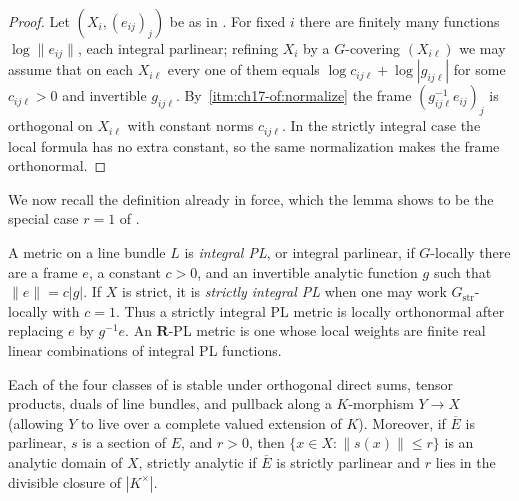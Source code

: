 \begin{proof}
Let $(X_i,(e_{ij})_j)$ be as in .  For
fixed $i$ there are finitely many functions $\log\|e_{ij}\|$, each
integral parlinear; refining $X_i$ by a $G$-covering $(X_{i\ell})$ we
may assume that on each $X_{i\ell}$ every one of them equals
$\log c_{ij\ell}+\log|g_{ij\ell}|$ for some $c_{ij\ell}>0$ and invertible
$g_{ij\ell}$.  By
\,\cref{itm:ch17-of:normalize} the frame
$(g_{ij\ell}^{-1}e_{ij})_j$ is orthogonal on $X_{i\ell}$ with constant
norms $c_{ij\ell}$.  In the strictly integral case the local formula has
no extra constant, so the same normalization makes the frame orthonormal.
\end{proof}

We now recall the definition already in force, which the lemma shows to be
the special case $r=1$ of .

\begin{definition}
\label{def:ch17-integral-pl-metric}
A metric on a line bundle $L$ is \emph{integral PL}, or integral
parlinear, if $G$-locally there are a frame $e$, a constant $c>0$, and an
invertible analytic function $g$ such that $\|e\|=c|g|$.  If $X$ is
strict, it is \emph{strictly integral PL} when one may work
$G_{\mathrm{str}}$-locally with $c=1$.  Thus a strictly integral PL metric
is locally orthonormal after replacing $e$ by $g^{-1}e$.  An
$\mathbf R$-PL metric is one whose local weights are finite real linear
combinations of integral PL functions.
\end{definition}

\begin{proposition}
\label{prop:ch17-parlinear-stability}
Each of the four classes of  is stable
under orthogonal direct sums, tensor products, duals of line bundles, and
pullback along a $K$-morphism $Y\to X$ (allowing $Y$ to live over a
complete valued extension of $K$).  Moreover, if $\overline E$ is
parlinear, $s$ is a section of $E$, and $r>0$, then
$\{x\in X:\|s(x)\|\le r\}$ is an analytic domain of $X$, strictly
analytic if $\overline E$ is strictly parlinear and $r$ lies in the
divisible closure of $|K^\times|$.
\end{proposition}

